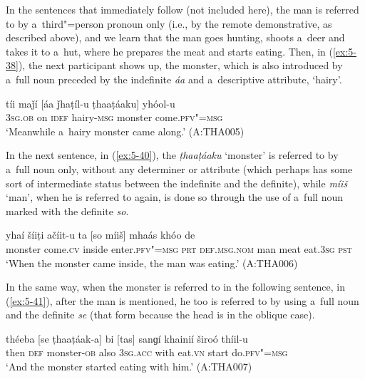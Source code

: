 In the sentences that immediately follow (not included here), the man is referred to by
a~third"=person pronoun only (i.e., by the remote demonstrative, as described above), and we learn
that the man goes hunting, shoots a~deer and takes it to a~hut, where he prepares the meat and
starts eating. Then, in (\ref{ex:5-38}), the next participant shows up, the monster, which is also
introduced by a~full noun preceded by the indefinite \textit{áa} and a~descriptive attribute,
`hairy'.
\begin{exe}
\ex
\label{ex:5-39}
\gll tíi maǰí [áa ǰhaṭíl-u ṭhaaṭáaku] yhóol-u\\
\textsc{3sg.ob} on \textsc{idef} hairy-\textsc{msg} monster come.\textsc{pfv"=msg}\\
\glt `Meanwhile a~hairy monster came along.' (A:THA005)
\end{exe}

In the next sentence, in (\ref{ex:5-40}), the \textit{ṭhaaṭáaku} `monster' is referred to by a~full noun
only, without any determiner or attribute (which perhaps has some sort of intermediate status
between the indefinite and the definite), while \textit{míiš} `man', when he is referred to
again, is done so through the use of a~full noun marked with the definite \textit{so}.
\begin{exe}
\ex
\label{ex:5-40}
\gll [ṭhaaṭáaku] yhaí šíiṭi ačíit-u ta [so míiš] mhaás khóo de\\
monster come.\textsc{cv} inside enter.\textsc{pfv"=msg} \textsc{prt} \textsc{def.msg.nom} man meat eat.\textsc{3sg} \textsc{pst}\\
\glt `When the monster came inside, the man was eating.' (A:THA006)
\end{exe}

In the same way, when the monster is referred to in the following sentence, in (\ref{ex:5-41}), after the man is mentioned, he too is referred to by using a~full noun and the definite \textit{se} (that form because the head is in the oblique case).
\begin{exe}
\ex
\label{ex:5-41}
\gll théeba [se ṭhaaṭáak-a] bi [tas] sanɡí khainií široó thíil-u\\
then \textsc{def} monster-\textsc{ob} also \textsc{3sg.acc} with eat.\textsc{vn} start do.\textsc{pfv"=msg}\\
\glt `And the monster started eating with him.' (A:THA007)
\end{exe}

